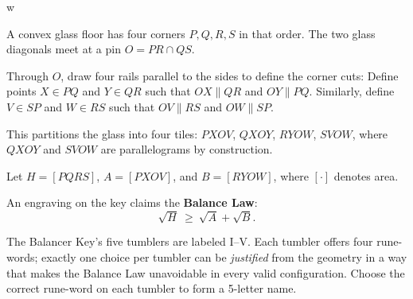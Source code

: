 
w

\Problem
\scriptsize
A convex glass floor has four corners \(P,Q,R,S\) in that order. The two glass diagonals meet at a pin \(O = PR\cap QS\).

Through \(O\), draw four rails parallel to the sides to define the corner cuts:
Define points \(X \in PQ\) and \(Y \in QR\) such that \(OX \parallel QR\) and \(OY \parallel PQ\).
Similarly, define \(V \in SP\) and \(W \in RS\) such that \(OV \parallel RS\) and \(OW \parallel SP\).

This partitions the glass into four tiles: \(PXOV\), \(QXOY\), \(RYOW\), \(SVOW\),
where \(QXOY\) and \(SVOW\) are parallelograms by construction.

Let \(H=[PQRS]\), \(A=[PXOV]\), and \(B=[RYOW]\), where \([\cdot]\) denotes area.

\medskip
An engraving on the key claims the \textbf{Balance Law}:
\[
\sqrt{H}\ \ge\ \sqrt{A}+\sqrt{B}.
\]

\medskip
The Balancer Key’s five tumblers are labeled I--V. Each tumbler offers four rune-words; exactly one choice per tumbler can be
\emph{justified} from the geometry in a way that makes the Balance Law unavoidable in every valid configuration.
Choose the correct rune-word on each tumbler to form a 5-letter name.

